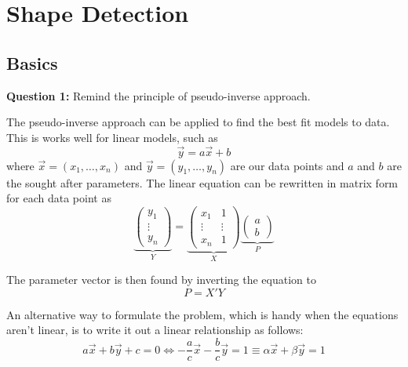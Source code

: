 \section{Shape Detection}
\label{sec:shape_detection}

\subsection{Basics}

\textbf{Question 1:} Remind the principle of pseudo-inverse approach.

\TODO{}

The pseudo-inverse approach can be applied to find the best fit models to data. This is works well for linear models, such as 
\begin{equation}
    \Vec{y} = a \vec{x} + b 
\end{equation}
where $\vec{x} = (x_1, \dots, x_n)$ and $\vec{y} = (y_1, \dots, y_n)$ are our data points and $a$ and $b$ are the sought after parameters. The linear equation can be rewritten in matrix form for each data point as
\begin{equation}
    \underbrace{\begin{pmatrix}
        y_1 \\
        \vdots \\
        y_n
    \end{pmatrix}}_{Y}
    =
    \underbrace{\begin{pmatrix}
        x_1 & 1 \\
        \vdots & \vdots \\
        x_n & 1
    \end{pmatrix}}_{X}
    \underbrace{\begin{pmatrix}
        a \\ b
    \end{pmatrix}}_{P}
\end{equation}

The parameter vector is then found by inverting the equation to 
\begin{equation}
    P = X' Y 
\end{equation}

An alternative way to formulate the problem, which is handy when the equations aren't linear, is to write it out a linear relationship as follows:
\begin{equation}
    a\vec{x} + b\vec{y} + c = 0 \Leftrightarrow -\frac{a}{c} \vec{x} - \frac{b}{c} \vec{y} = 1 \equiv \alpha \vec{x} + \beta \vec{y} = 1 
\end{equation}


